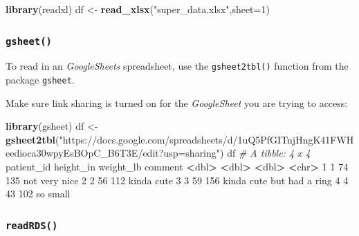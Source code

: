 \documentclass[]{book}
\newenvironment{Shaded}{\begin{snugshade}}{\end{snugshade}}
\newcommand{\CommentTok}[1]{\textcolor[rgb]{0.56,0.35,0.01}{\textit{#1}}}
\newcommand{\DataTypeTok}[1]{\textcolor[rgb]{0.13,0.29,0.53}{#1}}
\newcommand{\DecValTok}[1]{\textcolor[rgb]{0.00,0.00,0.81}{#1}}
\newcommand{\ErrorTok}[1]{\textcolor[rgb]{0.64,0.00,0.00}{\textbf{#1}}}
\newcommand{\KeywordTok}[1]{\textcolor[rgb]{0.13,0.29,0.53}{\textbf{#1}}}
\newcommand{\NormalTok}[1]{#1}
\newcommand{\OperatorTok}[1]{\textcolor[rgb]{0.81,0.36,0.00}{\textbf{#1}}}
\newcommand{\StringTok}[1]{\textcolor[rgb]{0.31,0.60,0.02}{#1}}
\begin{document}
\begin{Shaded}
\begin{Highlighting}[]
\KeywordTok{library}\NormalTok{(readxl)}
\NormalTok{df <-}\StringTok{ }\KeywordTok{read_xlsx}\NormalTok{(}\StringTok{"super_data.xlsx"}\NormalTok{,}\DataTypeTok{sheet=}\DecValTok{1}\NormalTok{)}
\end{Highlighting}
\end{Shaded}

\hypertarget{gsheet}{%
\subsubsection*{\texorpdfstring{\texttt{gsheet()}}{gsheet()}}\label{gsheet}}

To read in an \emph{GoogleSheets} spreadsheet, use the \texttt{gsheet2tbl()} function from the package \texttt{gsheet}.

Make sure link sharing is turned on for the \emph{GoogleSheet} you are trying to access:

\begin{Shaded}
\begin{Highlighting}[]
\KeywordTok{library}\NormalTok{(gsheet)}
\NormalTok{df <-}\StringTok{ }\KeywordTok{gsheet2tbl}\NormalTok{(}\StringTok{"https://docs.google.com/spreadsheets/d/1uQ5PfGITnjHngK41FWHeedioca30wpyEsBOpC_B6T3E/edit?usp=sharing"}\NormalTok{)}
\NormalTok{df}
\CommentTok{# A tibble: 4 x 4}
\NormalTok{  patient_id height_in weight_lb comment                  }
       \OperatorTok{<}\NormalTok{dbl}\OperatorTok{>}\StringTok{     }\ErrorTok{<}\NormalTok{dbl}\OperatorTok{>}\StringTok{     }\ErrorTok{<}\NormalTok{dbl}\OperatorTok{>}\StringTok{ }\ErrorTok{<}\NormalTok{chr}\OperatorTok{>}\StringTok{                    }
\DecValTok{1}          \DecValTok{1}        \DecValTok{74}       \DecValTok{135}\NormalTok{ not very nice            }
\DecValTok{2}          \DecValTok{2}        \DecValTok{56}       \DecValTok{112}\NormalTok{ kinda cute               }
\DecValTok{3}          \DecValTok{3}        \DecValTok{59}       \DecValTok{156}\NormalTok{ kinda cute but had a ring}
\DecValTok{4}          \DecValTok{4}        \DecValTok{43}       \DecValTok{102}\NormalTok{ so small                 }
\end{Highlighting}
\end{Shaded}

\hypertarget{readrds}{%
\subsubsection*{\texorpdfstring{\texttt{readRDS()}}{readRDS()}}\label{readrds}}
\end{document}
